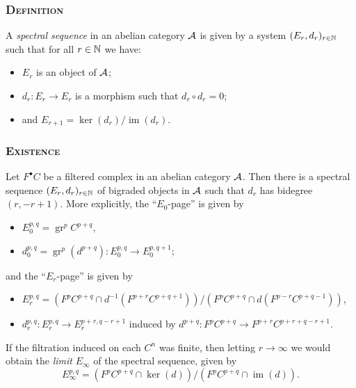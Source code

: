 \documentclass[notheorems, hyperref={backref}]{beamer}
\theoremstyle{plain}
\theoremstyle{definition}
\theoremstyle{darkredexample}
\theoremstyle{remark}
\DeclareMathOperator{\gr}{gr}
\DeclareMathOperator{\im}{im}
\begin{document}
\begin{frame}
    \frametitle{\textsc{Definition} \cite[\href{https://stacks.math.columbia.edu/tag/011N}{Tag 011N}]{stacks}}
    A \textit{spectral sequence} in an abelian category $\mathcal{A}$ is given by a system $(E_{r},d_{r})_{r\in \mathbb{N}}$ such that for all $r\in \mathbb{N}$ we have:
    \pause
    \begin{itemize}
	\item $E_{r}$ is an object of $\mathcal{A}$;
	    \pause
	\item $d_{r}\colon E_{r}\to E_{r}$ is a morphism such that $d_{r}\circ d_{r}=0$;
	    \pause
	\item and $E_{r+1}=\ker(d_{r})/\im(d_{r})$.
    \end{itemize}
\end{frame}

\begin{frame}
    \frametitle{\textsc{Existence} \cite[\href{https://stacks.math.columbia.edu/tag/012M}{Tag 012M}]{stacks}}
    Let $F^{\bullet}C$ be a filtered complex in an abelian category $\mathcal{A}$.
    \pause
    Then there is a spectral sequence $(E_{r},d_{r})_{r\in \mathbb{N}}$ of bigraded objects in $\mathcal{A}$ such that $d_{r}$ has bidegree $(r,-r+1)$.
    \pause
    More explicitly, the ``$E_{0}$-page'' is given by
    \begin{itemize}
	\item $E_{0}^{p,q}=\gr^{p}C^{p+q}$,
	\item $d_{0}^{p,q}=\gr^{p}(d^{p+q})\colon E_{0}^{p,q}\to E_{0}^{p,q+1}$;
    \end{itemize}
    \pause
    and the ``$E_{r}$-page'' is given by
    \begin{itemize}
	\item $E_{r}^{p,q}=(F^{p}C^{p+q}\cap d^{-1}(F^{p+r}C^{p+q+1}))/(F^{p}C^{p+q}\cap d(F^{p-r}C^{p+q-1}))$,
	\item $d_{r}^{p,q}\colon E_{r}^{p,q}\to E_{r}^{p+r,q-r+1}$ induced by $d^{p+q}\colon F^{p}C^{p+q}\to F^{p+r}C^{p+r+q-r+1}$.
    \end{itemize}
    \pause
    
    If the filtration induced on each $C^{n}$ was finite, then letting $r\to\infty$ we would obtain the \textit{limit} $E_{\infty}$ of the spectral sequence, given by
    \[ E_{\infty}^{p,q}=(F^{p}C^{p+q}\cap \ker(d))/(F^{p}C^{p+q}\cap \im(d)). \]
\end{frame}
\end{document}
